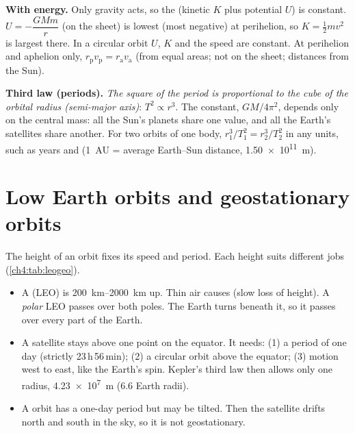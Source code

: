 \textbf{With energy.} Only gravity acts, so the  (kinetic $K$ plus potential
$U$) is constant. $U = -\dfrac{GMm}{r}$ (on the sheet) is lowest (most negative) at perihelion, so
$K = \tfrac12 mv^2$ is largest there. In a circular orbit $U$, $K$ and the speed are constant.
At perihelion and aphelion only, $r_\mathrm{p} v_\mathrm{p} = r_\mathrm{a} v_\mathrm{a}$ (from
equal areas; not on the sheet; distances from the Sun).

\textbf{Third law (periods).} \emph{The square of the period is proportional to the cube of the
orbital radius (semi-major axis)}: $T^2 \propto r^3$. The constant, $GM/4\pi^2$, depends only on
the central mass: all the Sun's planets share one value, and all the Earth's satellites share
another. For two orbits of one body, $r_1^3/T_1^2 = r_2^3/T_2^2$ in any units, such as
years and  (1~AU = average Earth--Sun distance, \qty{1.50e11}{m}).

\section{Low Earth orbits and geostationary orbits}\label{ch4:sec:leogeo}

\begin{bigidea}
The height of an orbit fixes its speed and period. Each height suits different jobs
(\cref{ch4:tab:leogeo}).
\end{bigidea}

\begin{itemize}
  \item A  (LEO) is \qtyrange{200}{2000}{km} up. Thin air causes
         (slow loss of height). A \emph{polar} LEO passes over both poles.
        The Earth turns beneath it, so it passes over every part of the Earth.
  \item A  satellite stays above one point on the equator. It needs:
        (1) a period of one day (strictly 23\,h\,56\,min); (2) a circular orbit above the
        equator; (3) motion west to east, like the Earth's spin. Kepler's third law then allows
        only one radius, \qty{4.23e7}{m} (6.6 Earth radii).
  \item A  orbit has a one-day period but may be tilted. Then the satellite
        drifts north and south in the sky, so it is not geostationary.
\end{itemize}


